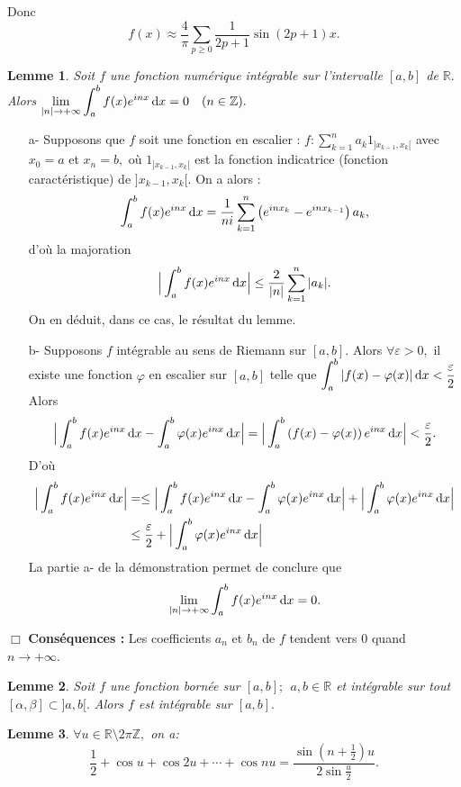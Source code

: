\documentclass[11pt, a4paper]{book}
\newtheorem{lem}{Lemme}[section]
\newenvironment{pr}{\noindent {\bf Preuve} \noindent} {\hfill $\Box$\vskip 5mm}
\begin{document}
Donc $$f(x)\approx \dfrac{4}{\pi}\sum_{p\geq0}\dfrac{1}{2p+1}\sin (2p+1)x.$$
\begin{lem}\label{lem7.2.1} Soit $f$ une fonction num\'erique int\'egrable sur l'intervalle $[a,b]$ de $\mathbb{R}.$ \\
Alors ${\displaystyle \lim_{|n|\rightarrow+\infty}\int_a^b f(x)e^{inx}\,\mathrm{d} x=0}\quad(n\in \mathbb{Z}).$
\end{lem}
\begin{pr}\quad
\begin{enumerate}
\item[a-] Supposons que $f$ soit une fonction en escalier :  $f:{\displaystyle \sum_{k=1}^{n}a_k1_{]x_{k-1},x_k[}}$ avec $x_0=a$ et $x_n=b,$ o\`u $1_{]x_{k-1},x_k[}$ est la fonction indicatrice (fonction caract\'eristique) de $]x_{k-1},x_k[$.  On a alors :  $$\int_a^b f(x)e^{inx}\,\mathrm{d} x=\dfrac{1}{ni}\sum_{k=1}^n\left(e^{inx_k}-e^{inx_{k-1}}\right)a_k,$$ d'o\`u la majoration $$\Big|\int_a^bf(x)e^{inx}\,\mathrm{d} x\Big|\leq \dfrac{2}{|n|}\sum_{k=1}^n|a_k|.$$
On en d\'eduit, dans ce cas, le r\'esultat du lemme.
\item[b-] Supposons $f$ int\'egrable au sens de Riemann sur $[a,b].$ Alors $\forall \varepsilon>0,$ il existe une fonction $\varphi$ en escalier sur $[a,b]$ telle que ${\displaystyle \int_a^b|f(x)-\varphi(x)|\,\mathrm{d} x<\dfrac{\varepsilon}{2}}$ Alors $$\Big|\int_a^bf(x)e^{inx}\,\mathrm{d} x-\int_a^b\varphi(x)e^{inx}\,\mathrm{d} x\Big|=\Big|\int_a^b\left(f(x)-\varphi(x)\right)e^{inx}\,\mathrm{d} x\Big|<\dfrac{\varepsilon}{2}.$$
D'o\`u \begin{align*}\Big|\int_a^bf(x)e^{inx}\,\mathrm{d} x\Big|&=\leq \Big|\int_a^bf(x)e^{inx}\,\mathrm{d} x-\int_a^b\varphi (x)e^{inx}\,\mathrm{d} x\Big|+\Big|\int_a^b\varphi(x)e^{inx}\,\mathrm{d} x\Big|\\&\leq \dfrac{\varepsilon}{2}+\Big|\int_a^b\varphi(x)e^{inx}\,\mathrm{d} x\Big|\end{align*}
La partie a- de la d\'emonstration permet de conclure que $$\lim_{|n|\rightarrow+\infty}\int_a^bf(x)e^{inx}\,\mathrm{d} x=0.$$
\end{enumerate}
\end{pr}
\textbf{Cons\'equences :} Les coefficients $a_n$ et $b_n$ de $f$ tendent vers $0$ quand $n\rightarrow+\infty.$
\begin{lem}\label{lem7.2.2} Soit $f$ une fonction born\'ee sur $[a,b];~~a,b\in \mathbb{R}$ et int\'egrable sur tout $[\alpha,\beta]\subset ]a,b[.$ Alors $f$ est int\'egrable sur $[a,b].$
\end{lem}
\begin{lem} \label{lem7.2.3} $\forall u\in \mathbb{R}\setminus2\pi\mathbb{Z},$ on a:$$\dfrac{1}{2}+\cos u+\cos 2u+\cdots+\cos nu=\dfrac{\sin(n+\frac{1}{2})u}{2\sin \frac{u}{2}}.$$
\end{lem}
\end{document}
